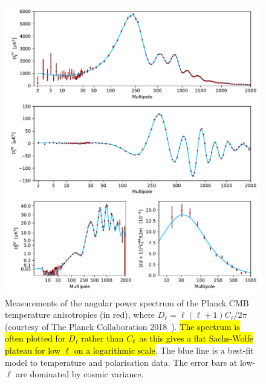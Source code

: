 \begin{figure}[htpb]
	\centering\capstart{}
	\includegraphics[trim={0 430 0 0},clip,width=\textwidth]{planck_2018_power_spectrum.pdf}
	\caption[
	The 2018 Planck CMB angular power spectrum in temperature
	]{
	Measurements of the angular power spectrum of the Planck CMB temperature anisotropies (in red), where \(D_{\ell} = \ell(\ell+1)C_{\ell}/2\pi{}\) (courtesy of The Planck Collaboration 2018~\cite{Planck2020}).
	\hl{The spectrum is often plotted for \mbox{\(D_{\ell}\)} rather than \mbox{\(C_{\ell}\)} as this gives a flat Sachs-Wolfe plateau for low \mbox{\(\ell{}\)} on a logarithmic scale}.
	The blue line is a best-fit model to temperature and polarisation data.
	The error bars at low-\(\ell{}\) are dominated by cosmic variance.
	}\label{fig:chapter2_power_spectrum}
\end{figure}
